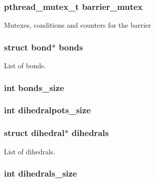\hypertarget{structengine_a6d51d6453171f1a276982cb1a221db18}{
\subsubsection[{barrier\-\_\-mutex}]{\setlength{\rightskip}{0pt plus 5cm}pthread\-\_\-mutex\-\_\-t barrier\-\_\-mutex}}\label{structengine_a6d51d6453171f1a276982cb1a221db18}
Mutexes, conditions and counters for the barrier \hypertarget{structengine_a8f2e5502792ec60f60f301d61cf8375d}{
\subsubsection[{bonds}]{\setlength{\rightskip}{0pt plus 5cm}struct {\bf bond}$\ast$ bonds}}\label{structengine_a8f2e5502792ec60f60f301d61cf8375d}
List of bonds. \hypertarget{structengine_a0b61fadd3e9b11fa981c051f7c6d9598}{
\subsubsection[{bonds\-\_\-size}]{\setlength{\rightskip}{0pt plus 5cm}int bonds\-\_\-size}}\label{structengine_a0b61fadd3e9b11fa981c051f7c6d9598}
\hypertarget{structengine_a452fe646d97bfb1d8faf33c77c8e84a4}{
\subsubsection[{dihedralpots\-\_\-size}]{\setlength{\rightskip}{0pt plus 5cm}int dihedralpots\-\_\-size}}\label{structengine_a452fe646d97bfb1d8faf33c77c8e84a4}
\hypertarget{structengine_a069ad44663915a13f48a413d6edacee9}{
\subsubsection[{dihedrals}]{\setlength{\rightskip}{0pt plus 5cm}struct {\bf dihedral}$\ast$ dihedrals}}\label{structengine_a069ad44663915a13f48a413d6edacee9}
List of dihedrals. \hypertarget{structengine_aa672b72c2af111a06d1f0ec88824e4ab}{
\subsubsection[{dihedrals\-\_\-size}]{\setlength{\rightskip}{0pt plus 5cm}int dihedrals\-\_\-size}}\label{structengine_aa672b72c2af111a06d1f0ec88824e4ab}
